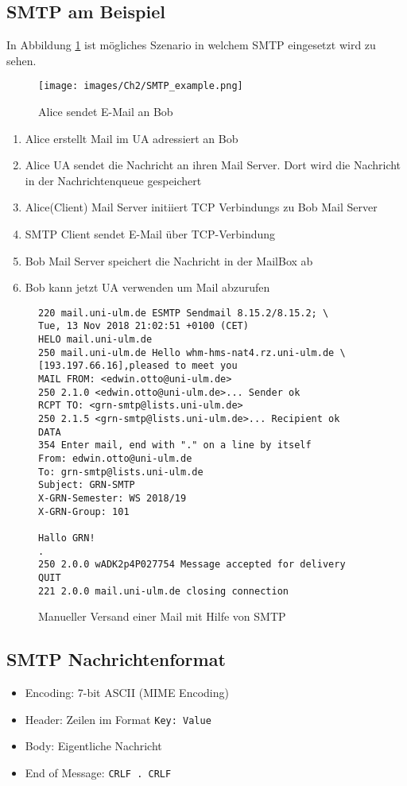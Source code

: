 \subsection{SMTP am Beispiel}
In Abbildung \ref{Ch02-SMTP_example} ist mögliches Szenario in welchem SMTP eingesetzt wird zu sehen.

\begin{figure}[H]
    \centering
    \texttt{[image: images/Ch2/SMTP\_example.png]}
    \caption{Alice sendet E-Mail an Bob}
    \label{Ch02-SMTP_example}
\end{figure}

\begin{enumerate}
    \item Alice erstellt Mail im UA adressiert an Bob
    \item Alice UA sendet die Nachricht an ihren Mail Server. Dort wird die Nachricht in der Nachrichtenqueue gespeichert
    \item Alice(Client) Mail Server initiiert TCP Verbindungs zu Bob Mail Server
    \item SMTP Client sendet E-Mail über TCP-Verbindung 
    \item Bob Mail Server speichert die Nachricht in der MailBox ab
    \item Bob kann jetzt UA verwenden um Mail abzurufen
\end{enumerate}

\begin{figure}[H]
\begin{lstlisting}[frame=single] 
220 mail.uni-ulm.de ESMTP Sendmail 8.15.2/8.15.2; \
Tue, 13 Nov 2018 21:02:51 +0100 (CET)
HELO mail.uni-ulm.de
250 mail.uni-ulm.de Hello whm-hms-nat4.rz.uni-ulm.de \
[193.197.66.16],pleased to meet you
MAIL FROM: <edwin.otto@uni-ulm.de>
250 2.1.0 <edwin.otto@uni-ulm.de>... Sender ok
RCPT TO: <grn-smtp@lists.uni-ulm.de>
250 2.1.5 <grn-smtp@lists.uni-ulm.de>... Recipient ok
DATA
354 Enter mail, end with "." on a line by itself
From: edwin.otto@uni-ulm.de
To: grn-smtp@lists.uni-ulm.de
Subject: GRN-SMTP
X-GRN-Semester: WS 2018/19
X-GRN-Group: 101

Hallo GRN!
.
250 2.0.0 wADK2p4P027754 Message accepted for delivery
QUIT
221 2.0.0 mail.uni-ulm.de closing connection

\end{lstlisting}
    \caption{Manueller Versand einer Mail mit Hilfe von SMTP}
    \label{SMTP_manex}
\end{figure}

\subsection{SMTP Nachrichtenformat}
\begin{itemize}
    \item Encoding: 7-bit ASCII (MIME Encoding)
    \item Header: Zeilen im Format \lstinline{Key: Value}
    \item Body: Eigentliche Nachricht
    \item End of Message: \lstinline{CRLF . CRLF}
\end{itemize}

